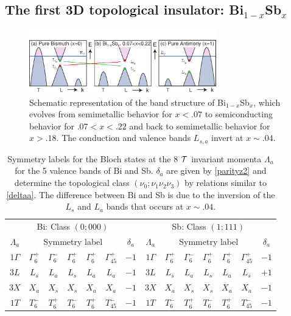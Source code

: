 \documentclass[twocolumn,floatfix,showpacs,rmp,aps]{revtex4}
\begin{document}
	
	
	
	\subsection{The first 3D topological insulator: Bi$_{1-x}$Sb$_x$}
	\label{sec:bisb}
	
	\begin{figure}
		\includegraphics[width=3.2in]{Fig8}
		\caption{Schematic representation of the band structure of Bi$_{1-x}$Sb$_x$,
			which evolves from semimetallic behavior for $x<.07$ to semiconducting behavior
			for $.07<x<.22$ and back to semimetallic behavior for $x>.18$.  The conduction
			and valence bands $L_{s,a}$ invert at $x \sim .04$. }
		\label{fig:bisbbands}
	\end{figure}
	\begin{table}
		\centering
		\begin{ruledtabular}
			\begin{tabular}{c|ccccc|c||c|ccccc|c}
				\multicolumn{7}{c||}{Bi: Class $(0;000)$ } &
				\multicolumn{7}{c}{Sb: Class $(1;111)$ } \\
				\multicolumn{1}{c}{$\Lambda_a$} &
				\multicolumn{5}{c}{Symmetry label}&
				\multicolumn{1}{c||}{$\delta_a$} &
				\multicolumn{1}{c}{$\Lambda_a$} &
				\multicolumn{5}{c}{Symmetry label} &
				\multicolumn{1}{c}{$\delta_a$} \\
				\hline
				$1\Gamma$ & $\Gamma_6^+$ & $\Gamma_6^-$ &$\Gamma_6^+$ &$\Gamma_6^+$ &
				$\Gamma_{45}^+$ & $-1$ &
				$1\Gamma$ & $\Gamma_6^+$ & $\Gamma_6^-$ &$\Gamma_6^+$ &$\Gamma_6^+$ &
				$\Gamma_{45}^+$ & $-1$ \\
				$3L$ & $L_s$ &$L_a$ &$L_s$ &$L_a$ &$L_a$ & $-1$ &
				$3L$ & $L_s$ &$L_a$ &$L_s$ &$L_a$ &$L_s$ & $+1$ \\
				$3X$ & $X_a$ & $X_s$ & $X_s$ & $X_a$ & $X_a$  & $-1$ &
				$3X$ & $X_a$ & $X_s$ & $X_s$ & $X_a$ & $X_a$  & $-1$ \\
				$1T$ & $T_6^-$ & $T_6^+$ & $T_6^-$ & $T_6^+$ & $T_{45}^-$ & $-1$ &
				$1T$ & $T_6^-$ & $T_6^+$ & $T_6^-$ & $T_6^+$ & $T_{45}^-$ & $-1$\\
			\end{tabular}
		\end{ruledtabular}
		\caption{Symmetry labels for the Bloch states at the 8 ${\cal T}$ invariant momenta
			$\Lambda_a$ for the 5 valence bands of Bi and Sb.
			$\delta_a$ are given by \eqref{parityz2} and
			determine the topological class $(\nu_0;\nu_1\nu_2\nu_3)$ by
			relations similar to \eqref{deltaa}.
			The difference between Bi and Sb is due to the inversion of
			the $L_s$ and $L_a$ bands that occurs at $x \sim .04$.}
		\label{tab:bisbtab}
	\end{table}
	
\end{document}
